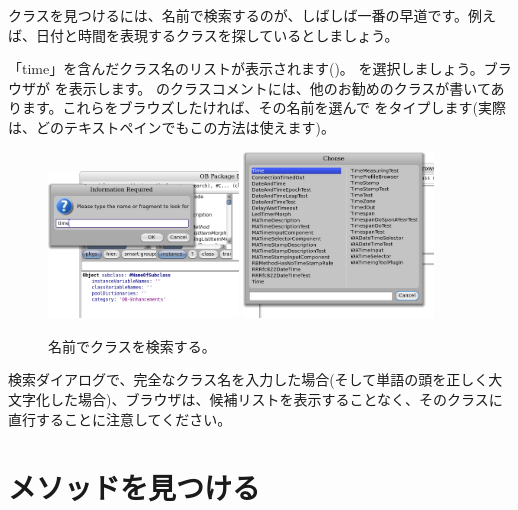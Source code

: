 \documentclass[a4paper,10pt,twoside]{book}
\begin{document}
クラスを見つけるには、名前で検索するのが、しばしば一番の早道です。例えば、日付と時間を表現するクラスを探しているとしましょう。

\noindent
「time」を含んだクラス名のリストが表示されます()。 を選択しましょう。ブラウザが  を表示します。 のクラスコメントには、他のお勧めのクラスが書いてあります。これらをブラウズしたければ、その名前を選んで  をタイプします(実際は、どのテキストペインでもこの方法は使えます)。

\begin{figure}[hbt]
\centerline{
	\includegraphics[width=0.45\textwidth]{FindIt}
	\hspace{1cm}
	\includegraphics[width=0.45\textwidth]{TimeClasses}
}
\caption{名前でクラスを検索する。
}
\end{figure}

検索ダイアログで、完全なクラス名を入力した場合(そして単語の頭を正しく大文字化した場合)、ブラウザは、候補リストを表示することなく、そのクラスに直行することに注意してください。

\section{メソッドを見つける}
\end{document}
